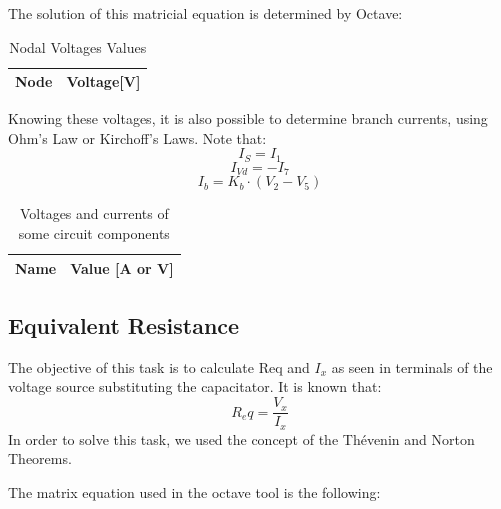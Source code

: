 The solution of this matricial equation is determined by Octave:
\begin{table}[H]
  \centering
  \begin{tabular}{|l|r|}
    \hline    
    {\bf Node} & {\bf Voltage[V]} \\ \hline
    
  \end{tabular}
  \caption{Nodal Voltages Values}
  \label{tab:nodal}
\end{table}

Knowing these voltages, it is also possible to determine branch currents, using Ohm’s Law or Kirchoff's Laws.
Note that:
\begin{equation}
  I_S=I_1
\end{equation}
\begin{equation}
  I_{Vd}=-I_7
 \end{equation}
 \begin{equation}
  I_b=K_b\cdot(V_2-V_5)
\end{equation}
 
 \begin{table}[H]
  \centering
  \begin{tabular}{|l|r|}
    \hline    
    {\bf Name} & {\bf Value [A or V]} \\ \hline
    
  \end{tabular}
  \caption{Voltages and currents of some circuit components}
  \label{tab:valn}
\end{table}

\subsection{Equivalent Resistance}
The objective of this task is to calculate Req and $I_x$ as seen in terminals of the voltage source substituting the capacitator. It is known that:
\begin{equation}
   R_eq= \frac{V_x}{I_x}
\end{equation}
In order to solve this task, we used the concept of the Thévenin and Norton Theorems.\par
The matrix equation used in the octave tool is the following:

